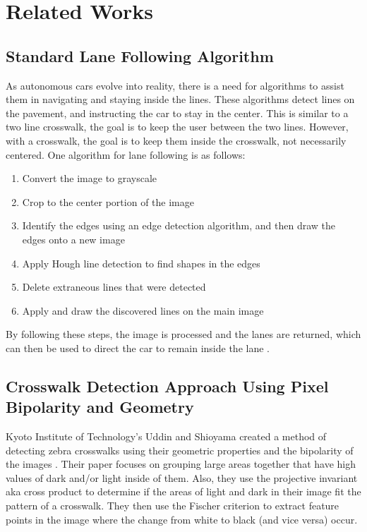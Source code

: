 \documentclass[12pt]{ucthesis}
\begin{document}
\chapter{Related Works}
\label{Related Works}

\section{Standard Lane Following Algorithm}
As autonomous cars evolve into reality, there is a need for algorithms
to assist them in navigating and staying inside the lines. These
algorithms detect lines on the pavement, and
instructing the car to stay in the center. This is similar to
a two line crosswalk, the goal is to keep the user between the two
lines. However, with a crosswalk, the goal is to keep them inside the crosswalk, not necessarily centered.
One algorithm for lane following is as follows:
\begin{enumerate}
  \item Convert the image to grayscale
  \item Crop to the center portion of the image
  \item Identify the edges using an edge detection algorithm, and then draw the
  edges onto a new image
  \item Apply Hough line detection to find shapes in the edges
  \item Delete extraneous lines that were detected
  \item Apply and draw the discovered lines on the main image
\end{enumerate}
By following these steps, the image is processed and the lanes are returned,
which can then be used to direct the car to remain inside the lane \cite{SingleLane1}.



\section{Crosswalk Detection Approach Using Pixel Bipolarity and Geometry}

Kyoto Institute of Technology's Uddin and Shioyama created a method of detecting zebra crosswalks using their geometric properties and the bipolarity of the images \cite{relatedworkbipolarity}. Their paper focuses on grouping large areas together that have high values of dark and/or light inside of them. Also, they use the projective invariant aka cross product to determine if the areas of light and dark in their image fit the pattern of a crosswalk. They then use the Fischer criterion to extract feature points in the image where the change from white to black (and vice versa) occur.
\end{document}
